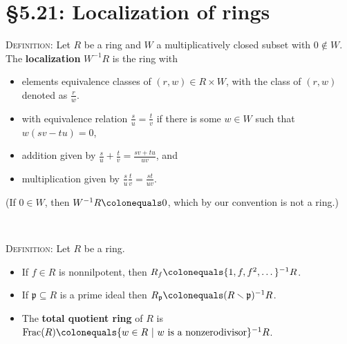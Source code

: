 \documentclass[12pt]{amsart}
\newcommand{\p}{\mathfrak{p}}
\renewcommand{\1}{\mathbbm{1}}
\newcommand{\ds}{\displaystyle}
\newcommand{\showsol}[1]{\def\displaysol{#1}}
\newcommand\ceq{\colonequals}
\begin{document}
\showsol{0}
	
	\thispagestyle{empty}
	
	\section*{\S5.21: Localization of rings}	

\begin{framed}



\noindent \textsc{Definition:} Let $R$ be a ring and $W$ a multiplicatively closed subset with $0\notin W$. The \textbf{localization} $W^{-1}R$ is the ring with
\begin{itemize}
\item  elements equivalence classes of $(r,w)\in R\times W$, with the class of $(r,w)$ denoted as $\ds \frac{r}{w}$.
\smallskip
\item with equivalence relation $\ds \frac{s}{u} = \frac{t}{v}$ if there is some $w\in W$ such that $w(sv-tu)=0$,
\smallskip
\item addition given by $\ds\frac{s}{u} + \frac{t}{v} = \frac{sv+tu}{uv}$, and
\smallskip
\item multiplication given by $\ds\frac{s}{u}  \frac{t}{v} = \frac{st}{uv}$.
\end{itemize}
(If $0\in W$, then $W^{-1}R\ceq 0$, which by our convention is not a ring.)

\

\noindent \textsc{Definition:} Let $R$ be a ring.
\begin{itemize}
\item If $f\in R$ is nonnilpotent\footnotemark, then $R_f \ceq \{1,f,f^2,\dots\}^{-1} R$.
\item If $\p \subseteq R$ is a prime ideal then $R_{\p} \ceq (R\smallsetminus \p)^{-1} R$.
\item The \textbf{total quotient ring} of $R$ is $\mathrm{Frac}(R)\ceq \{ w\in R \ | \ w \ \text{is a nonzerodivisor}\}^{-1}R$.
\end{itemize}

\



\end{framed}
\end{document}
